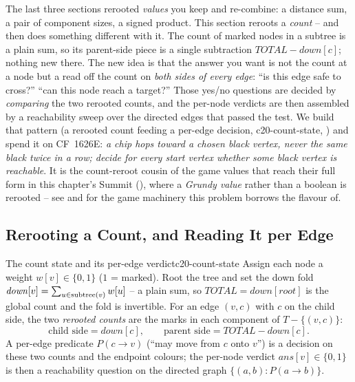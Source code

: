 \begin{topicintro}
The last three sections rerooted \emph{values} you keep and re-combine: a
distance sum, a pair of component sizes, a signed product. This section reroots
a \emph{count} -- and then does something different with it. The count of marked
nodes in a subtree is a plain sum, so its parent-side piece is a single
subtraction $\mathit{TOTAL}-\mathit{down}[c]$; nothing new there. The new idea is
that the answer you want is not the count at a node but a  read off
the count on \emph{both sides of every edge}: ``is this edge safe to cross?''
``can this node reach a target?'' Those yes/no questions are decided by
\emph{comparing} the two rerooted counts, and the per-node verdicts are then
assembled by a reachability sweep over the directed edges that passed the test.
We build that pattern (a rerooted count feeding a per-edge decision, 
{c20-count-state}, ) and spend it on CF~1626E:
\emph{a chip hops toward a chosen black vertex, never the same black twice in a
row; decide for every start vertex whether some black vertex is reachable}. It is
the count-reroot cousin of the game values that reach their full form in this
chapter's Summit (), where a \emph{Grundy value} rather than a
boolean is rerooted -- see  and  for the game
machinery this problem borrows the flavour of.
\end{topicintro}

\subsection{Rerooting a Count, and Reading It per Edge}

\begin{definition}{The count state and its per-edge verdict}{c20-count-state}
Assign each node a weight $w[v]\in\{0,1\}$ ($1$ = marked). Root the tree and set
the down fold $\mathit{down}[v] = \sum_{u\in\operatorname{subtree}(v)} w[u]$ -- a plain sum, so
$\mathit{TOTAL}=\mathit{down}[\mathit{root}]$ is the global count and the fold is
invertible. For an edge $(v,c)$ with $c$ on the child side, the two \emph{rerooted
counts} are the marks in each component of $T - \{(v,c)\}$:
\[
  \text{child side} = \mathit{down}[c], \qquad
  \text{parent side} = \mathit{TOTAL} - \mathit{down}[c].
\]
A per-edge predicate $P(c\!\to\! v)$ (``may move from $c$ onto $v$'') is a
decision on these two counts and the endpoint colours; the per-node verdict
$\mathit{ans}[v]\in\{0,1\}$ is then a reachability question on the directed graph
$\{(a,b): P(a\!\to\!b)\}$.
\end{definition}


